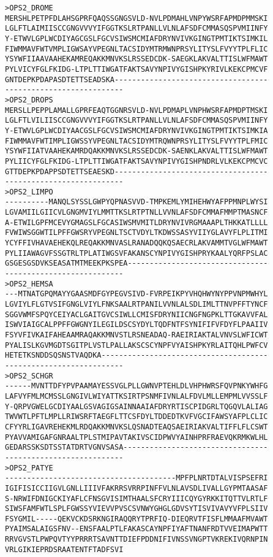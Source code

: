 \documentclass[12pt]{report}
\begin{document}
\unix{}
\begin{verbatim}
>OPS2_DROME
MERSHLPETPFDLAHSGPRFQAQSSGNGSVLD-NVLPDMAHLVNPYWSRFAPMDPMMSKI
LGLFTLAIMIISCCGNGVVVYIFGGTKSLRTPANLLVLNLAFSDFCMMASQSPVMIINFY
Y-ETWVLGPLWCDIYAGCGSLFGCVSIWSMCMIAFDRYNVIVKGINGTPMTIKTSIMKIL
FIWMMAVFWTVMPLIGWSAYVPEGNLTACSIDYMTRMWNPRSYLITYSLFVYYTPLFLIC
YSYWFIIAAVAAHEKAMREQAKKMNVKSLRSSEDCDK-SAEGKLAKVALTTISLWFMAWT
PYLVICYFGLFKIDG-LTPLTTIWGATFAKTSAVYNPIVYGISHPKYRIVLKEKCPMCVF
GNTDEPKPDAPASDTETTSEADSKA-----------------------------------
---------------------------
>OPS2_DROPS
MERSLLPEPPLAMALLGPRFEAQTGGNRSVLD-NVLPDMAPLVNPHWSRFAPMDPTMSKI
LGLFTLVILIISCCGNGVVVYIFGGTKSLRTPANLLVLNLAFSDFCMMASQSPVMIINFY
Y-ETWVLGPLWCDIYAACGSLFGCVSIWSMCMIAFDRYNVIVKGINGTPMTIKTSIMKIA
FIWMMAVFWTIMPLIGWSSYVPEGNLTACSIDYMTRQWNPRSYLITYSLFVYYTPLFMIC
YSYWFIIATVAAHEKAMRDQAKKMNVKSLRSSEDCDK-SAENKLAKVALTTISLWFMAWT
PYLIICYFGLFKIDG-LTPLTTIWGATFAKTSAVYNPIVYGISHPNDRLVLKEKCPMCVC
GTTDEPKPDAPPSDTETTSEAESKD-----------------------------------
---------------------------
>OPS2_LIMPO
----------MANQLSYSSLGWPYQPNASVVD-TMPKEMLYMIHEHWYAFPPMNPLWYSI
LGVAMIILGIICVLGNGMVIYLMMTTKSLRTPTNLLVVNLAFSDFCMMAFMMPTMASNCF
A-ETWILGPFMCEVYGMAGSLFGCASIWSMVMITLDRYNVIVRGMAAAPLTHKKATLLLL
FVWIWSGGWTILPFFGWSRYVPEGNLTSCTVDYLTKDWSSASYVIIYGLAVYFLPLITMI
YCYFFIVHAVAEHEKQLREQAKKMNVASLRANADQQKQSAECRLAKVAMMTVGLWFMAWT
PYLIIAWAGVFSSGTRLTPLATIWGSVFAKANSCYNPIVYGISHPRYKAALYQRFPSLAC
GSGESGSDVKSEASATMTMEEKPKSPEA--------------------------------
---------------------------
>OPS2_HEMSA
---MTNATGPQMAYYGAASMDFGYPEGVSIVD-FVRPEIKPYVHQHWYNYPPVNPMWHYL
LGVIYLFLGTVSIFGNGLVIYLFNKSAALRTPANILVVNLALSDLIMLTTNVPFFTYNCF
SGGVWMFSPQYCEIYACLGAITGVCSIWLLCMISFDRYNIICNGFNGPKLTTGKAVVFAL
ISWVIAIGCALPPFFGWGNYILEGILDSCSYDYLTQDFNTFSYNIFIFVFDYFLPAAIIV
FSYVFIVKAIFAHEAAMRAQAKKMNVSTLRSNEADAQ-RAEIRIAKTALVNVSLWFICWT
PYALISLKGVMGDTSGITPLVSTLPALLAKSCSCYNPFVYAISHPKYRLAITQHLPWFCV
HETETKSNDDSQSNSTVAQDKA--------------------------------------
---------------------------
>OPS2_SCHGR
------MVNTTDFYPVPAAMAYESSVGLPLLGWNVPTEHLDLVHPHWRSFQVPNKYWHFG
LAFVYFMLMCMSSLGNGIVLWIYATTKSIRTPSNMFIVNLALFDVLMLLEMPMLVVSSLF
Y-QRPVGWELGCDIYAALGSVAGIGSAINNAAIAFDRYRTISCPIDGRLTQGQVLALIAG
TWVWTLPFTLMPLLRIWSRFTAEGFLTTCSFDYLTDDEDTKVFVGCIFAWSYAFPLCLIC
CFYYRLIGAVREHEKMLRDQAKKMNVKSLQSNADTEAQSAEIRIAKVALTIFFLFLCSWT
PYAVVAMIGAFGNRAALTPLSTMIPAVTAKIVSCIDPWVYAINHPRFRAEVQKRMKWLHL
GEDARSSKSDTSSTATDRTVGNVSASA---------------------------------
---------------------------
>OPS2_PATYE
---------------------------------------MPFPLNRTDTALVISPSEFRI
IGIFISICCIIGVLGNLLIIIVFAKRRSVRRPINFFVLNLAVSDLIVALLGYPMTAASAF
S-NRWIFDNIGCKIYAFLCFNSGVISIMTHAALSFCRYIIICQYGYRKKITQTTVLRTLF
SIWSFAMFWTLSPLFGWSSYVIEVVPVSCSVNWYGHGLGDVSYTISVIVAVYVFPLSIIV
FSYGMIL-----QEKVCKDSRKNGIRAQQRYTPRFIQ-DIEQRVTFISFLMMAAFMVAWT
PYAIMSALAIGSFNV--ENSFAALPTLFAKASCAYNPFIYAFTNANFRDTVVEIMAPWTT
RRVGVSTLPWPQVTYYPRRRTSAVNTTDIEFPDDNIFIVNSSVNGPTVKREKIVQRNPIN
VRLGIKIEPRDSRAATENTFTADFSVI
\end{verbatim}
\end{document}
